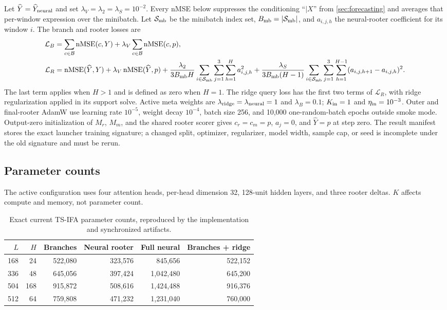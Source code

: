 \documentclass[10pt]{article}
\newcommand{\code}[1]{\texttt{\detokenize{#1}}}
\newcommand{\nMSE}{\operatorname{nMSE}}
\begin{document}
Let $\widehat Y=\widehat Y_{\rm neural}$ and set
$\lambda_V=\lambda_2=\lambda_S=10^{-2}$. Every nMSE below suppresses the
conditioning ``$\mid X$'' from \cref{sec:forecasting} and averages that
per-window expression over the minibatch. Let $\mathcal S_{\rm mb}$ be the
minibatch index set, $B_{\rm mb}=|\mathcal S_{\rm mb}|$, and
$a_{i,j,h}$ the neural-rooter coefficient for its window $i$. The branch and
rooter losses are
\begin{align}
 \mathcal L_B
 &=\sum_{c\in\mathcal B}\nMSE(c,Y)
 +\lambda_V\sum_{c\in\mathcal B}\nMSE(c,p),\\
 \mathcal L_R
 &=\nMSE(\widehat Y,Y)+\lambda_V\nMSE(\widehat Y,p)
 +\frac{\lambda_2}{3B_{\rm mb}H}
 \sum_{i\in\mathcal S_{\rm mb}}\sum_{j=1}^{3}\sum_{h=1}^H a_{i,j,h}^2
 +\frac{\lambda_S}{3B_{\rm mb}(H-1)}
 \sum_{i\in\mathcal S_{\rm mb}}\sum_{j=1}^{3}\sum_{h=1}^{H-1}
 (a_{i,j,h+1}-a_{i,j,h})^2.
\end{align}
The last term applies when $H>1$ and is defined as zero when $H=1$.
The ridge query loss has the first two terms of $\mathcal L_R$, with ridge
regularization applied in its support solve. Active meta weights are
$\lambda_{\rm ridge}=\lambda_{\rm neural}=1$ and $\lambda_B=0.1$;
$K_{\rm in}=1$ and $\eta_{\rm in}=10^{-3}$. Outer and final-rooter AdamW use
learning rate $10^{-5}$, weight decay $10^{-4}$, batch size 256, and 10,000
one-random-batch epochs outside smoke mode.
Output-zero initialization of $M_r$, $M_m$, and the shared rooter scorer gives
$c_r=c_m=p$, $a_j=0$, and $\widehat Y=p$ at step zero.
The result manifest stores the exact launcher training signature; a changed
split, optimizer, regularizer, model width, sample cap, or seed is incomplete
under the old signature and must be rerun.
\fi

\subsection{Parameter counts}

The active configuration uses four attention heads, per-head dimension 32,
128-unit hidden layers, and three rooter deltas. $K$ affects compute and memory,
not parameter count.

\begin{table}[H]
\centering
\small
\caption{Exact current TS-IFA parameter counts, reproduced by the implementation
and synchronized \code{config.json} artifacts.}
\label{tab:tsifa-counts}
\begin{tabular}{@{}rrrrrr@{}}
\toprule
$L$ & $H$ & Branches & Neural rooter & Full neural & Branches + ridge \\
\midrule
168 & 24  & 522,080 & 323,576 & 845,656 & 522,152 \\
336 & 48  & 645,056 & 397,424 & 1,042,480 & 645,200 \\
504 & 168 & 915,872 & 508,616 & 1,424,488 & 916,376 \\
512 & 64  & 759,808 & 471,232 & 1,231,040 & 760,000 \\
\bottomrule
\end{tabular}
\end{table}
\end{document}
